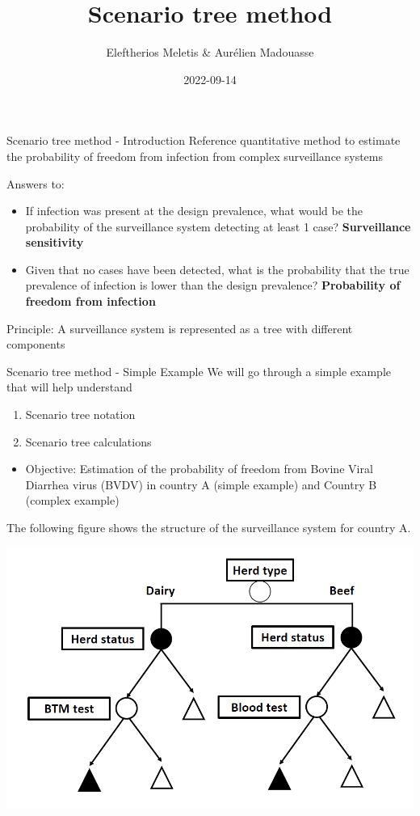 \documentclass[
  ignorenonframetext,
]{beamer}
\title{Scenario tree method}
\author{Eleftherios Meletis \& Aurélien Madouasse}
\date{2022-09-14}
\providecommand{\tightlist}{%
  \setlength{\itemsep}{0pt}\setlength{\parskip}{0pt}}
\begin{document}
\frame{\titlepage}

\begin{frame}{Scenario tree method - Introduction}
\protect\hypertarget{scenario-tree-method---introduction}{}
Reference quantitative method to estimate the probability of freedom
from infection from complex surveillance systems

Answers to:

\begin{itemize}
\tightlist
\item
  If infection was present at the design prevalence, what would be the
  probability of the surveillance system detecting at least 1 case?
  \textbf{Surveillance sensitivity}
\item
  Given that no cases have been detected, what is the probability that
  the true prevalence of infection is lower than the design prevalence?
  \textbf{Probability of freedom from infection}
\end{itemize}

Principle: A surveillance system is represented as a tree with different
components
\end{frame}

\begin{frame}{Scenario tree method - Simple Example}
\protect\hypertarget{scenario-tree-method---simple-example}{}
We will go through a simple example that will help understand

\begin{enumerate}
\item Scenario tree notation 
\item Scenario tree calculations
\end{enumerate}

\begin{itemize}
\tightlist
\item
  Objective: Estimation of the probability of freedom from Bovine Viral
  Diarrhea virus (BVDV) in country A (simple example) and Country B
  (complex example)
\end{itemize}
\end{frame}

\begin{frame}{}
\protect\hypertarget{section}{}
The following figure shows the structure of the surveillance system for
country A.

\includegraphics{figs/simple_scenario_tree.png}
\end{frame}
\end{document}
